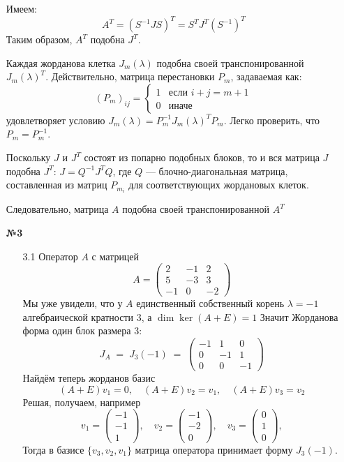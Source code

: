\documentclass[a4paper]{article}
\begin{document}
\begin{enumerate}
  Имеем:
  \[
  A^T = (S^{-1} J S)^T = S^T J^T (S^{-1})^T
  \]
  Таким образом, \( A^T \) подобна \( J^T \).

  Каждая жорданова клетка \( J_m(\lambda) \)
   подобна своей транспонированной \( J_m(\lambda)^T \). Действительно,
    матрица перестановки \( P_m \), задаваемая как:
  \[
  (P_m)_{ij} = \begin{cases}
  1 & \text{если } i + j = m + 1 \\
  0 & \text{иначе}
  \end{cases}
  \]
  удовлетворяет условию \( J_m(\lambda) = P_m^{-1} J_m(\lambda)^T P_m \). Легко проверить, что \( P_m = P_m^{-1} \).

  Поскольку \( J \) и \( J^T \) состоят из попарно подобных блоков, то 
  и вся матрица \( J \) подобна \( J^T \): \( J = Q^{-1} J^T Q \),
   где \( Q \) — блочно-диагональная матрица, составленная из матриц 
   \( P_{m_i} \) для соответствующих жордановых клеток.

  Следовательно, матрица \( A \) подобна своей транспонированной \( A^T \)
  
  \item[\textbf{№3}]\begin{enumerate}
    \item[3.1]Оператор $A$ с матрицей
    $$
    A=\begin{pmatrix}
    2 & -1 & 2\\
    5 & -3 & 3\\
    -1& 0  & -2
    \end{pmatrix}
    $$
    Мы уже увидели, что у $A$ единственный собственный корень $\lambda=-1$ 
    алгебраической кратности 3, а
    $\dim\ker(A+E)=1$
    Значит Жорданова форма один блок размера 3:
    $$
    J_A \;=\; J_3(-1)\;=\;
    \begin{pmatrix}
    -1 & 1 & 0\\
    0  & -1 & 1\\
    0  & 0  & -1
    \end{pmatrix}
    $$
    Найдём теперь жорданов базис
    $$
    (A+E)v_1=0,\quad (A+E)v_2=v_1,\quad (A+E)v_3=v_2
    $$
    Решая, получаем, например
    $$
    v_1=\begin{pmatrix}-1\\-1\\1\end{pmatrix},\quad
    v_2=\begin{pmatrix}-1\\-2\\0\end{pmatrix},\quad
    v_3=\begin{pmatrix}0\\1\\0\end{pmatrix},
    $$
    Тогда в базисе $\{v_3,v_2,v_1\}$ матрица оператора принимает форму $J_3(-1)$.\\


\end{enumerate}
\end{enumerate}
\end{document}
